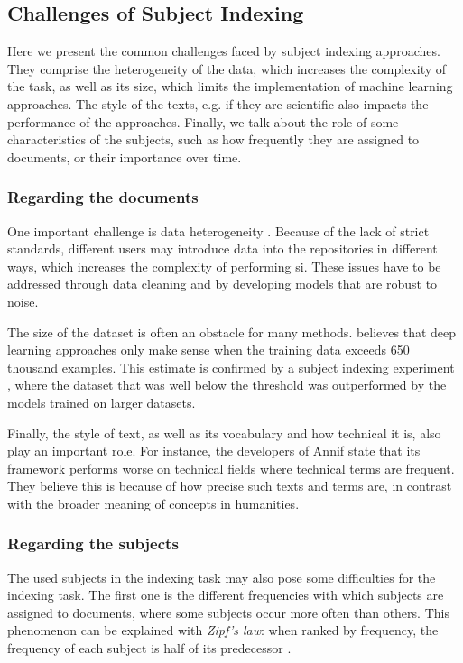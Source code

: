 \subsection{Challenges of Subject Indexing} \label{subject_indexing_challenges}

Here we present the common challenges faced by subject indexing approaches. They comprise the heterogeneity of the data, which increases the complexity of the task, as well as its size, which limits the implementation of machine learning approaches. The style of the texts, e.g. if they are scientific also impacts the performance of the approaches. Finally, we talk about the role of some characteristics of the subjects, such as how frequently they are assigned to documents, or their importance over time.

\subsubsection{Regarding the documents}

One important challenge is data heterogeneity \cite{kasprzik2020putting}. Because of the lack of strict standards, different users may introduce data into the repositories in different ways, which increases the complexity of performing \acrshort{si}. These issues have to be addressed through data cleaning and by developing models that are robust to noise.

The size of the dataset is often an obstacle for many methods. \cite{zhang2015character} believes that deep learning approaches only make sense when the training data exceeds 650 thousand examples. This estimate is confirmed by a subject indexing experiment \cite{mai2018using}, where the dataset that was well below the threshold was outperformed by the models trained on larger datasets.

Finally, the style of text, as well as its vocabulary and how technical it is, also play an important role. For instance, the developers of Annif \cite{suominen2019annif} state that its framework performs worse on technical fields where technical terms are frequent. They believe this is because of how precise such texts and terms are, in contrast with the broader meaning of concepts in humanities.

\subsubsection{Regarding the subjects}

The used subjects in the indexing task may also pose some difficulties for the indexing task. The first one is the different frequencies with which subjects are assigned to documents, where some subjects occur more often than others. This phenomenon can be explained with \textit{Zipf's law}: when ranked by frequency, the frequency of each subject is half of its predecessor \cite{toepfer2020fusion}.

